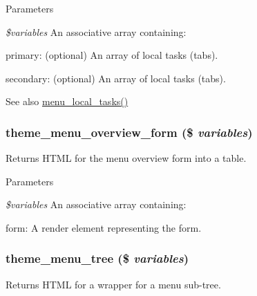 \begin{DoxyParams}{Parameters}
\item[{\em \$variables}]An associative array containing:
\begin{DoxyItemize}
\item primary: (optional) An array of local tasks (tabs).
\item secondary: (optional) An array of local tasks (tabs).
\end{DoxyItemize}\end{DoxyParams}
\begin{DoxySeeAlso}{See also}
\hyperlink{group__menu_gadb8bb3644e114166950142280085cf3e}{menu\_\-local\_\-tasks()} 
\end{DoxySeeAlso}
\hypertarget{group__themeable_gacdf929f3196f98910f9761b46d672767}{
\subsubsection[{theme\_\-menu\_\-overview\_\-form}]{\setlength{\rightskip}{0pt plus 5cm}theme\_\-menu\_\-overview\_\-form (\$ {\em variables})}}
\label{group__themeable_gacdf929f3196f98910f9761b46d672767}
Returns HTML for the menu overview form into a table.


\begin{DoxyParams}{Parameters}
\item[{\em \$variables}]An associative array containing:
\begin{DoxyItemize}
\item form: A render element representing the form. 
\end{DoxyItemize}\end{DoxyParams}
\hypertarget{group__themeable_ga33100f9d25d899b017bda922086f7358}{
\subsubsection[{theme\_\-menu\_\-tree}]{\setlength{\rightskip}{0pt plus 5cm}theme\_\-menu\_\-tree (\$ {\em variables})}}
\label{group__themeable_ga33100f9d25d899b017bda922086f7358}
Returns HTML for a wrapper for a menu sub-\/tree.


